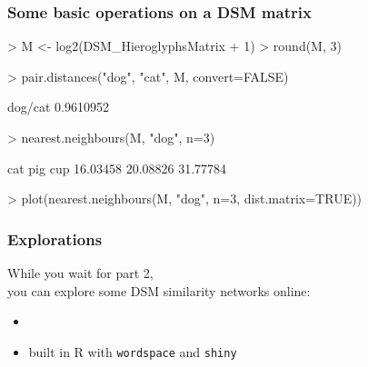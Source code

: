 \documentclass[t]{beamer} %
\begin{document}
\begin{frame}[fragile]
  \frametitle{Some basic operations on a DSM matrix}

\begin{Rcode}
> M <- log2(DSM_HieroglyphsMatrix + 1) 
> round(M, 3)

> pair.distances("dog", "cat", M, convert=FALSE)\begin{Rout}
  dog/cat 
0.9610952\end{Rout}

> nearest.neighbours(M, "dog", n=3)\begin{Rout}
     cat      pig      cup 
16.03458 20.08826 31.77784\end{Rout}

> plot(nearest.neighbours(M, "dog", n=3, dist.matrix=TRUE))
\end{Rcode}

\end{frame}

\begin{frame}[c]
  \frametitle{Explorations}
  
  While you wait for part 2,\\ you can explore some DSM similarity networks online:
  \begin{itemize}
  \item {}
  \item built in R with \texttt{wordspace} and \texttt{shiny}
\end{itemize}
\end{frame}



\end{document}

